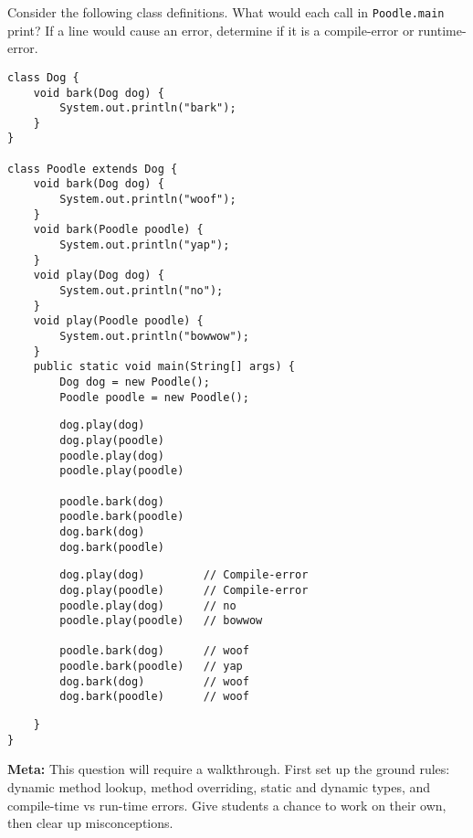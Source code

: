 \begin{blocksection}
\question Consider the following class definitions. What would each call in
\lstinline$Poodle.main$ print? If a line would cause an error, determine if it
is a compile-error or runtime-error.

\begin{lstlisting}
class Dog {
    void bark(Dog dog) {
        System.out.println("bark");
    }
}

class Poodle extends Dog {
    void bark(Dog dog) {
        System.out.println("woof");
    }
    void bark(Poodle poodle) {
        System.out.println("yap");
    }
    void play(Dog dog) {
        System.out.println("no");
    }
    void play(Poodle poodle) {
        System.out.println("bowwow");
    }
    public static void main(String[] args) {
        Dog dog = new Poodle();
        Poodle poodle = new Poodle();
\end{lstlisting}

\ifprintanswers\else
\begin{lstlisting}
        dog.play(dog)
        dog.play(poodle)
        poodle.play(dog)
        poodle.play(poodle)

        poodle.bark(dog)
        poodle.bark(poodle)
        dog.bark(dog)
        dog.bark(poodle)
\end{lstlisting}
\fi

\begin{solution}
\begin{lstlisting}
        dog.play(dog)         // Compile-error
        dog.play(poodle)      // Compile-error
        poodle.play(dog)      // no
        poodle.play(poodle)   // bowwow

        poodle.bark(dog)      // woof
        poodle.bark(poodle)   // yap
        dog.bark(dog)         // woof
        dog.bark(poodle)      // woof
\end{lstlisting}
\end{solution}

\begin{lstlisting}
    }
}
\end{lstlisting}

\begin{solution}
\textbf{Meta:} This question will require a walkthrough. First set up the
ground rules: dynamic method lookup, method overriding, static and dynamic
types, and compile-time vs run-time errors. Give students a chance to work on
their own, then clear up misconceptions.
\end{solution}
\end{blocksection}
